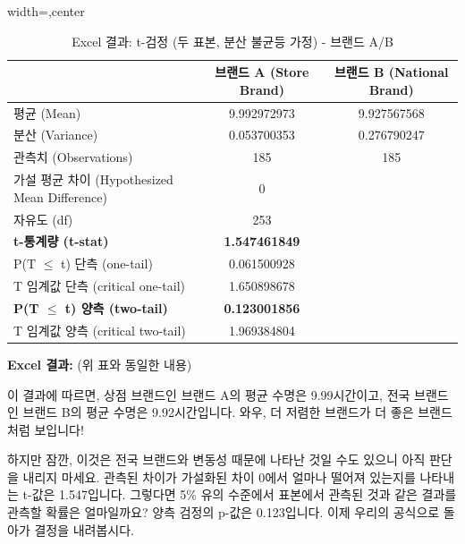 \documentclass[11pt,a4paper]{article}
\begin{document}
\begin{tcolorbox}[mybox, title=두 브랜드 비교 (6/8): 3단계 - p-값 계산 (두 모집단)]
\begin{table}[h!]
    \centering
    \caption{Excel 결과: t-검정 (두 표본, 분산 불균등 가정) - 브랜드 A/B}
    \label{tab:excel_output_battery}
    \begin{adjustbox}{width=\textwidth,center}
    \begin{tabular}{lcc}
        \toprule
        \textbf{} & \textbf{브랜드 A (Store Brand)} & \textbf{브랜드 B (National Brand)} \\
        \midrule
        평균 (Mean) & 9.992972973 & 9.927567568 \\
        분산 (Variance) & 0.053700353 & 0.276790247 \\
        관측치 (Observations) & 185 & 185 \\
        가설 평균 차이 (Hypothesized Mean Difference) & 0 & \\
        자유도 (df) & 253 & \\
        \textbf{t-통계량 (t-stat)} & \textbf{1.547461849} & \\
        P(T $\le$ t) 단측 (one-tail) & 0.061500928 & \\
        T 임계값 단측 (critical one-tail) & 1.650898678 & \\
        \textbf{P(T $\le$ t) 양측 (two-tail)} & \textbf{0.123001856} & \\
        T 임계값 양측 (critical two-tail) & 1.969384804 & \\
        \bottomrule
    \end{tabular}
    \end{adjustbox}
\end{table}
\end{tcolorbox}

\begin{tcolorbox}[mybox, title=두 브랜드 비교 (7/8): 결과 해석 및 주의점]
\textbf{Excel 결과:} (위 표와 동일한 내용)

이 결과에 따르면, 상점 브랜드인 브랜드 A의 평균 수명은 9.99시간이고, 전국 브랜드인 브랜드 B의 평균 수명은 9.92시간입니다. 와우, 더 저렴한 브랜드가 더 좋은 브랜드처럼 보입니다!

하지만 잠깐, 이것은 전국 브랜드와 변동성 때문에 나타난 것일 수도 있으니 아직 판단을 내리지 마세요. 관측된 차이가 가설화된 차이 0에서 얼마나 떨어져 있는지를 나타내는 t-값은 1.547입니다. 그렇다면 5\% 유의 수준에서 표본에서 관측된 것과 같은 결과를 관측할 확률은 얼마일까요? 양측 검정의 p-값은 0.123입니다. 이제 우리의 공식으로 돌아가 결정을 내려봅시다.
\end{tcolorbox}
\end{document}
